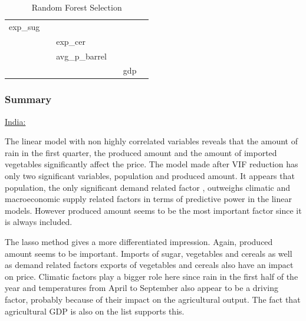 \documentclass[11pt]{article}
\begin{document}
\begin{table}[!htbp]
\begin{adjustbox}{max width=\textwidth}
\begin{tabular}{llllll}
exp\_sug               &                           &                        &                           &                      &                           \\ 
                       &                           & exp\_cer               &                           &                      &                           \\ 
                       &                           & avg\_p\_barrel         &                           &                      &                           \\ 
                       &                           &                        &                           & gdp                  &                          \\ \hline
\end{tabular}
\end{adjustbox}
\caption{Random Forest Selection}
\label{table22}
\end{table}
\FloatBarrier

\subsubsection{Summary}

\begin{center} \underline{India:} \end{center}
The linear model with non highly correlated variables reveals that the amount of rain in the first quarter, the produced amount and the amount of imported vegetables significantly affect the price. 
The model made after VIF reduction has only two significant variables, population and produced amount. It appears that population, the only significant demand related factor , outweighs climatic and macroeconomic supply related factors in terms of predictive power in the linear models. However produced amount seems to be the most important factor since it is always included.

The lasso method gives a more differentiated impression.
Again, produced amount seems to be important. Imports of sugar, vegetables and cereals as well as demand related factors exports of vegetables and cereals also have an impact on price. Climatic factors play a bigger role here since rain in the first half of the year and temperatures from April to September also appear to be a driving factor, probably because of their impact on the agricultural output. The fact that agricultural GDP is also on the list supports this.
\end{document}
